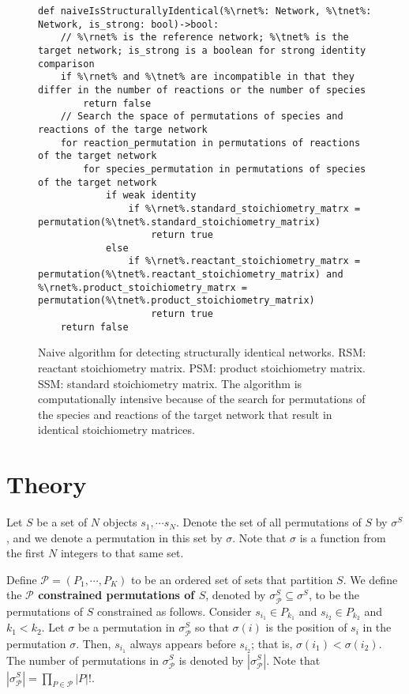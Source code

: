 \documentclass{article}
\newcommand{\rnet}{$\mathcal{R}$} %
\newcommand{\tnet}{$\mathcal{T}$} %
\begin{document}
\begin{figure}
\begin{lstlisting}[mathescape=true,escapechar=\%]
def naiveIsStructurallyIdentical(%\rnet%: Network, %\tnet%: Network, is_strong: bool)->bool:
    // %\rnet% is the reference network; %\tnet% is the target network; is_strong is a boolean for strong identity comparison
    if %\rnet% and %\tnet% are incompatible in that they differ in the number of reactions or the number of species
        return false
    // Search the space of permutations of species and reactions of the targe network
    for reaction_permutation in permutations of reactions of the target network
        for species_permutation in permutations of species of the target network
            if weak identity
                if %\rnet%.standard_stoichiometry_matrx = permutation(%\tnet%.standard_stoichiometry_matrix)
                    return true
            else
                if %\rnet%.reactant_stoichiometry_matrx = permutation(%\tnet%.reactant_stoichiometry_matrix) and %\rnet%.product_stoichiometry_matrx = permutation(%\tnet%.product_stoichiometry_matrix)
                    return true
    return false
\end{lstlisting}
\caption{Naive algorithm for detecting structurally identical networks. RSM: reactant stoichiometry matrix. PSM: product stoichiometry matrix. SSM: standard stoichiometry matrix. The algorithm is computationally intensive because of the search for permutations of the species and reactions of the target network that result in identical stoichiometry matrices.}\label{fig:naive}
\end{figure}



\section{Theory}

Let $S$ be a set of $N$ objects $s_1, \cdots s_N$. Denote the set of all permutations of $S$ by $\sigma^S$, and we denote a permutation in this set by $\sigma$. Note that $\sigma$ is a function from the first $N$ integers to that same set.

Define $\mathcal{P} = (P_1, \cdots, P_K)$ to be an ordered set of sets that partition $S$.
We define the {\bf $\mathcal{P}$ constrained 
permutations of $S$}, denoted by
$\sigma^S_{\mathcal{P}} \subseteq \sigma^S$, 
to be the permutations of $S$ constrained as follows.
Consider $s_{i_1} \in P_{k_1}$ and $s_{i_2} \in P_{k_2}$ and
$k_1 < k_2$. Let $\sigma$ be a permutation in $\sigma^S_{\mathcal{P}}$ so that $\sigma(i)$ is the position of $s_i$ in the permutation $\sigma$. Then, $s_{i_1}$ always appears before $s_{i_2}$; that is,  $\sigma(i_1) < \sigma(i_2)$. The number of permutations in  $\sigma^S_{\mathcal{P}}$ is denoted by  $|\sigma^S_{\mathcal{P}}|$.
Note that $|\sigma^S_{\mathcal{P}}| = \prod_{P \in \mathcal{P}} |P|!$.
\end{document}
